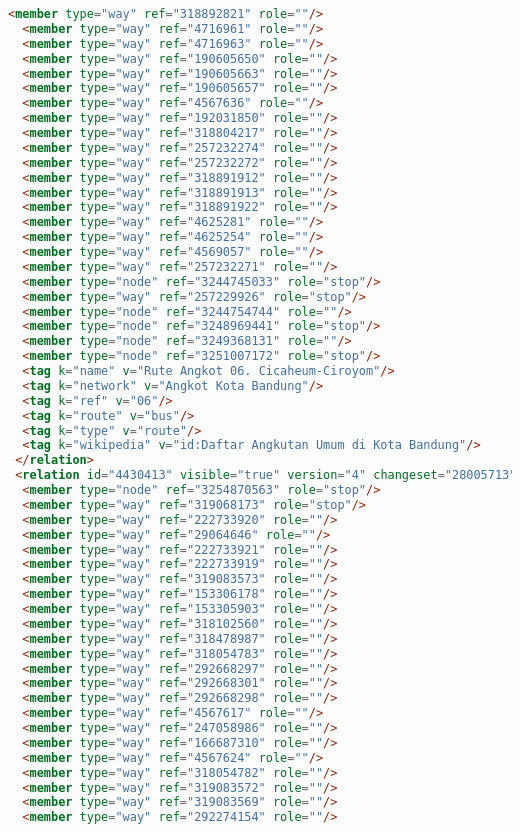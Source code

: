 \begin{lstlisting}[language=HTML,basicstyle=\tiny,caption=bandung1.xml]
  <member type="way" ref="318892821" role=""/>
  <member type="way" ref="4716961" role=""/>
  <member type="way" ref="4716963" role=""/>
  <member type="way" ref="190605650" role=""/>
  <member type="way" ref="190605663" role=""/>
  <member type="way" ref="190605657" role=""/>
  <member type="way" ref="4567636" role=""/>
  <member type="way" ref="192031850" role=""/>
  <member type="way" ref="318804217" role=""/>
  <member type="way" ref="257232274" role=""/>
  <member type="way" ref="257232272" role=""/>
  <member type="way" ref="318891912" role=""/>
  <member type="way" ref="318891913" role=""/>
  <member type="way" ref="318891922" role=""/>
  <member type="way" ref="4625281" role=""/>
  <member type="way" ref="4625254" role=""/>
  <member type="way" ref="4569057" role=""/>
  <member type="way" ref="257232271" role=""/>
  <member type="node" ref="3244745033" role="stop"/>
  <member type="way" ref="257229926" role="stop"/>
  <member type="node" ref="3244754744" role=""/>
  <member type="node" ref="3248969441" role="stop"/>
  <member type="node" ref="3249368131" role=""/>
  <member type="node" ref="3251007172" role="stop"/>
  <tag k="name" v="Rute Angkot 06. Cicaheum-Ciroyom"/>
  <tag k="network" v="Angkot Kota Bandung"/>
  <tag k="ref" v="06"/>
  <tag k="route" v="bus"/>
  <tag k="type" v="route"/>
  <tag k="wikipedia" v="id:Daftar Angkutan Umum di Kota Bandung"/>
 </relation>
 <relation id="4430413" visible="true" version="4" changeset="28005713" timestamp="2015-01-08T20:32:48Z" user="isonpurba" uid="2552445">
  <member type="node" ref="3254870563" role="stop"/>
  <member type="way" ref="319068173" role="stop"/>
  <member type="way" ref="222733920" role=""/>
  <member type="way" ref="29064646" role=""/>
  <member type="way" ref="222733921" role=""/>
  <member type="way" ref="222733919" role=""/>
  <member type="way" ref="319083573" role=""/>
  <member type="way" ref="153306178" role=""/>
  <member type="way" ref="153305903" role=""/>
  <member type="way" ref="318102560" role=""/>
  <member type="way" ref="318478987" role=""/>
  <member type="way" ref="318054783" role=""/>
  <member type="way" ref="292668297" role=""/>
  <member type="way" ref="292668301" role=""/>
  <member type="way" ref="292668298" role=""/>
  <member type="way" ref="4567617" role=""/>
  <member type="way" ref="247058986" role=""/>
  <member type="way" ref="166687310" role=""/>
  <member type="way" ref="4567624" role=""/>
  <member type="way" ref="318054782" role=""/>
  <member type="way" ref="319083572" role=""/>
  <member type="way" ref="319083569" role=""/>
  <member type="way" ref="292274154" role=""/>

\end{lstlisting}
